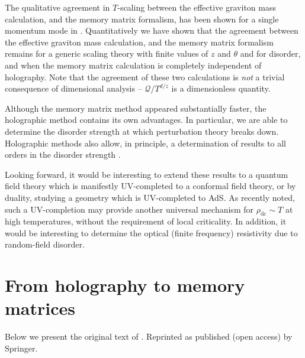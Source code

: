 \documentclass[10pt, oneside]{book}
\begin{document}
\begin{doublespace}
The qualitative agreement in $T$-scaling between the effective graviton mass calculation, and the memory matrix formalism, has been shown for a single momentum mode in \cite{Blake:2013owa}.   
Quantitatively we have shown that the agreement between the effective graviton mass calculation, and the memory matrix formalism remains 
for a generic scaling theory with finite values of $z$ and $\theta$ and for disorder, and when the memory matrix calculation is completely independent of holography.
Note that the agreement of these two calculations is \emph{not} a trivial consequence of dimensional analysis -- $\mathcal{Q}/T^{d/z}$ is a dimensionless quantity.    %

Although the memory matrix method appeared substantially faster, the holographic method contains its own advantages. In particular, we are able to determine the disorder strength at which perturbation theory breaks down.   Holographic methods also allow, in principle, a determination of results to all orders in the disorder strength \cite{Hartnoll:2014cua}.  

Looking forward, it would be interesting to extend these results to a quantum field theory which is manifestly UV-completed to a conformal field theory, or by duality, studying a geometry which is UV-completed to AdS.  As \cite{Hartnoll:2014gba} recently noted, such a UV-completion may provide another universal mechanism for $\rho_{\mathrm{dc}}\sim T$ at high temperatures, without the requirement of local criticality.   In addition, %
  it would be interesting to %
  determine the optical (finite frequency) resistivity due to random-field disorder.


\chapter{From holography to memory matrices}

Below we present the original text of \cite{Lucas:2015vna}.   Reprinted as published (open access) by Springer.


\end{doublespace}
\end{document}

